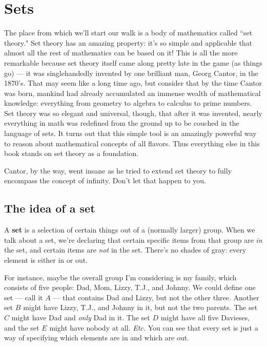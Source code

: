 
\chapter{Sets}
\label{chap:sets}

The place from which we'll start our walk is a body of mathematics called
``set theory." Set theory has an amazing property: it's so simple and
applicable that almost all the rest of mathematics can be based on it! This
is all the more remarkable because set theory itself came along pretty late
in the game (as things go) --- it was singlehandedly invented by one
brilliant man, Georg Cantor, in the 1870's. That may seem like a long time
ago, but consider that by the time Cantor was born, mankind had already
accumulated an immense wealth of mathematical knowledge: everything from
geometry to algebra to calculus to prime numbers. Set theory was so elegant
and universal, though, that after it was invented, nearly everything in
math was redefined from the ground up to be couched in the language of
sets. It turns out that this simple tool is an amazingly powerful way to
reason about mathematical concepts of all flavors. Thus everything else in
this book stands on set theory as a foundation.

Cantor, by the way, went insane as he tried to extend set theory to fully
encompass the concept of infinity. Don't let that happen to you.



\section{The idea of a set}

A \textbf{set}  is a selection of certain things out of a
(normally larger) group.  When we talk about a set, we're declaring that
certain specific items from that group are \textit{in} the set, and certain
items are \textit{not} in the set. There's no shades of gray: every element
is either in or out. 

For instance, maybe the overall group I'm considering is my family, which
consists of five people: Dad, Mom, Lizzy, T.J., and Johnny. We could
define one set --- call it $A$ --- that contains Dad and Lizzy, but not
the other three. Another set $B$ might have Lizzy, T.J., and Johnny in it,
but not the two parents. The set $C$ might have Dad and \textit{only}
Dad in it.  The set $D$ might have all five Davieses,  and the set $E$
might have nobody at all. \textit{Etc.} You can see that every set is just
a way of specifying which elements are in and which are out.


